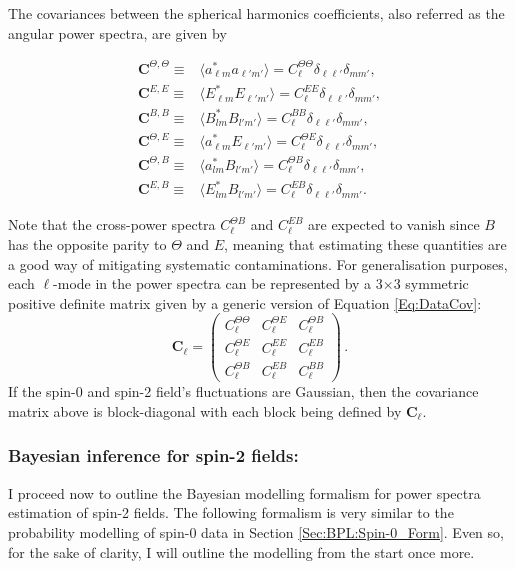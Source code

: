 \qquad The covariances between the spherical harmonics coefficients, also referred as the angular power spectra, are given by

\begin{align}
\label{eqn::chCmbPol_psTT}
\textbf{C}^{\Theta,\Theta}  \equiv & \langle a_{\ell m}^{*} a_{\ell'm'} \rangle  = C_{\ell}^{\Theta\Theta}\delta_{\ell\ell'}\delta_{mm'},\\
\label{eqn::chCmbPol_psEE}
\textbf{C}^{E,E} \equiv & \langle E_{\ell m}^{*} E_{\ell'm'} \rangle = C_{\ell}^{EE}\delta_{\ell\ell'}\delta_{mm'},\\
\label{eqn::chCmbPol_psBB}
\textbf{C}^{B,B} \equiv &\langle B_{lm}^{*} B_{l'm'} \rangle = C_{\ell}^{BB}\delta_{\ell\ell'}\delta_{mm'},\\
\label{eqn::chCmbPol_psTE}
\textbf{C}^{\Theta,E} \equiv & \langle a_{\ell m}^{*} E_{\ell'm'} \rangle = C_{\ell}^{\Theta E}\delta_{\ell\ell'}\delta_{mm'}, \\
\textbf{C}^{\Theta,B} \equiv &\langle a_{lm}^{*} B_{l'm'} \rangle = C_{\ell}^{\Theta B}\delta_{\ell\ell'}\delta_{mm'},\\
\textbf{C}^{E,B} \equiv &\langle E_{lm}^{*} B_{l'm'} \rangle = C_{\ell}^{EB}\delta_{\ell\ell'}\delta_{mm'}.
\end{align}

\qquad Note that the cross-power spectra $ C_{\ell}^{\Theta B}$ and $C_{\ell}^{EB}$ are expected to vanish since $B$ has the opposite parity to $\Theta$ and $E$, meaning that estimating these quantities are a good way of mitigating systematic contaminations. For generalisation purposes, each $\ell$-mode in the power spectra can be represented by a 3$\times$3 symmetric positive definite matrix given by a generic version of Equation \eqref{Eq:DataCov}:
\begin{equation}
\mathbf{C}_{\ell}=\left(
\begin{array}{ccc}
C_{\ell}^{\Theta\Theta} & C_{\ell}^{\Theta E} &  C_{\ell}^{\Theta B}\\
C_{\ell}^{\Theta E} & C_{\ell}^{EE} & C_{\ell}^{E B} \\
C_{\ell}^{\Theta B} & C_{\ell}^{E B} & C_{\ell}^{BB}
\end{array} \right)\, .
\label{Eq:Cl_blockDiag}
\end{equation}
\noindent If the spin-0 and spin-2 field's fluctuations are Gaussian, then the covariance matrix above is block-diagonal with each block being defined by $\mathbf{C}_{\ell}$. 

\subsubsection{Bayesian inference for spin-2 fields:}
I proceed now to outline the Bayesian modelling formalism for power spectra estimation of spin-2 fields. The following formalism is very similar to the probability modelling of spin-0 data in Section %
\ref{Sec:BPL:Spin-0_Form}. Even so, for the sake of clarity, I will outline the modelling from the start once more. 

